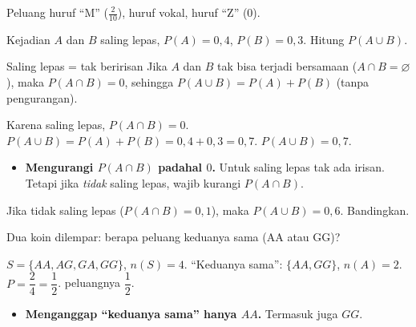 \begin{variasi}
Peluang huruf ``M'' ($\frac{2}{10}$), huruf vokal, huruf ``Z'' ($0$).
\end{variasi}

\begin{soalbox}{}
Kejadian $A$ dan $B$ saling lepas, $P(A)=0{,}4$, $P(B)=0{,}3$. Hitung
$P(A\cup B)$.
\end{soalbox}

\begin{ingat}{Saling lepas = tak beririsan}
Jika $A$ dan $B$ tak bisa terjadi bersamaan ($A\cap B=\varnothing$), maka
$P(A\cap B)=0$, sehingga $P(A\cup B)=P(A)+P(B)$ (tanpa pengurangan).
\end{ingat}

\jawab
{} Karena saling lepas, $P(A\cap B)=0$.
 $P(A\cup B)=P(A)+P(B)=0{,}4+0{,}3=0{,}7$.
\jadi $P(A\cup B)=0{,}7$.

\begin{jebakan}
\begin{itemize}[leftmargin=*,topsep=2pt]
  \item \textbf{Mengurangi $P(A\cap B)$ padahal $0$.} Untuk saling lepas tak ada
  irisan. Tetapi jika \emph{tidak} saling lepas, wajib kurangi $P(A\cap B)$.
\end{itemize}
\end{jebakan}

\begin{variasi}
Jika tidak saling lepas ($P(A\cap B)=0{,}1$), maka $P(A\cup B)=0{,}6$. Bandingkan.
\end{variasi}

\begin{soalbox}{}
Dua koin dilempar: berapa peluang keduanya sama (AA atau GG)?
\end{soalbox}

\jawab
{} $S=\{AA,AG,GA,GG\}$, $n(S)=4$.
 ``Keduanya sama'': $\{AA,GG\}$, $n(A)=2$.
 $P=\dfrac{2}{4}=\dfrac12$.
\jadi peluangnya $\dfrac12$.

\begin{jebakan}
\begin{itemize}[leftmargin=*,topsep=2pt]
  \item \textbf{Menganggap ``keduanya sama'' hanya $AA$.} Termasuk juga $GG$.
\end{itemize}
\end{jebakan}

